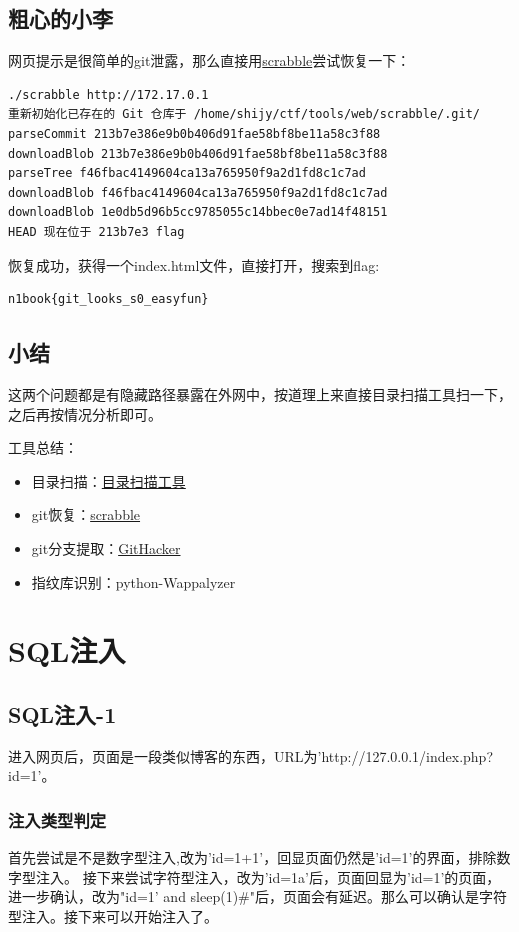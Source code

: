 \newpage

\subsection{粗心的小李}
网页提示是很简单的git泄露，那么直接用\href{https://github.com/denny0223/scrabble}{scrabble}尝试恢复一下：
\begin{lstlisting}
./scrabble http://172.17.0.1
重新初始化已存在的 Git 仓库于 /home/shijy/ctf/tools/web/scrabble/.git/
parseCommit 213b7e386e9b0b406d91fae58bf8be11a58c3f88
downloadBlob 213b7e386e9b0b406d91fae58bf8be11a58c3f88
parseTree f46fbac4149604ca13a765950f9a2d1fd8c1c7ad
downloadBlob f46fbac4149604ca13a765950f9a2d1fd8c1c7ad
downloadBlob 1e0db5d96b5cc9785055c14bbec0e7ad14f48151
HEAD 现在位于 213b7e3 flag
\end{lstlisting}

恢复成功，获得一个index.html文件，直接打开，搜索到flag:
\begin{lstlisting}
n1book{git_looks_s0_easyfun}
\end{lstlisting}

\subsection{小结}
这两个问题都是有隐藏路径暴露在外网中，按道理上来直接目录扫描工具扫一下，之后再按情况分析即可。

工具总结：
\begin{itemize}
    \item 目录扫描：\href{https://github.com/maurosoria/dirsearch}{目录扫描工具}
    \item git恢复：\href{https://github.com/denny0223/scrabble}{scrabble}
    \item git分支提取：\href{https://github.com/WangYihang/GitHacker}{GitHacker}
    \item 指纹库识别：python-Wappalyzer
\end{itemize}


\section{SQL注入}
\subsection{SQL注入-1}
进入网页后，页面是一段类似博客的东西，URL为'http://127.0.0.1/index.php?id=1'。

\subsubsection*{注入类型判定}
首先尝试是不是数字型注入,改为'id=1+1'，回显页面仍然是'id=1'的界面，排除数字型注入。
接下来尝试字符型注入，改为'id=1a'后，页面回显为'id=1'的页面，进一步确认，改为"id=1' and sleep(1)\#"后，页面会有延迟。那么可以确认是字符型注入。接下来可以开始注入了。

